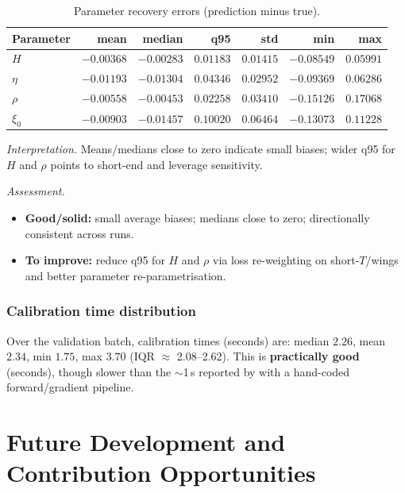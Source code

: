 	\begin{table}[t]
		\centering
		\caption{Parameter recovery errors (prediction minus true).}
		\label{tab:param_recovery}
		\begin{tabular}{lrrrrrr}
			\toprule
			Parameter & mean & median & q95 & std & min & max \\
			\midrule
			$H$   & $-0.00368$ & $-0.00283$ & $0.01183$ & $0.01415$ & $-0.08549$ & $0.05991$ \\
			$\eta$& $-0.01193$ & $-0.01304$ & $0.04346$ & $0.02952$ & $-0.09369$ & $0.06286$ \\
			$\rho$& $-0.00558$ & $-0.00453$ & $0.02258$ & $0.03410$ & $-0.15126$ & $0.17068$ \\
			$\xi_0$& $-0.00903$ & $-0.01457$ & $0.10020$ & $0.06464$ & $-0.13073$ & $0.11228$ \\
			\bottomrule
		\end{tabular}
		
		\smallskip
		\footnotesize
		\textit{Interpretation.} Means/medians close to zero indicate small biases; wider q95 for $H$ and $\rho$ points to short-end and leverage sensitivity.
	\end{table}
	
	\noindent\textit{Assessment.}
	\begin{itemize}
		\item \textbf{Good/solid:} small average biases; medians close to zero; directionally consistent across runs.
		\item \textbf{To improve:} reduce q95 for $H$ and $\rho$ via loss re-weighting on short-$T$/wings and better parameter re-parametrisation.
	\end{itemize}
	
	\subsection*{Calibration time distribution}
	
	Over the validation batch, calibration times (seconds) are: median $2.26$, mean $2.34$, min $1.75$, max $3.70$ (IQR $\approx$ 2.08–2.62). This is \textbf{practically good} (seconds), though slower than the $\sim$1\,s reported by \citet{Baschetti2024DeepCalibrationRandomGrids} with a hand-coded forward/gradient pipeline.
	
	
	\chapter{Future Development and Contribution Opportunities}
	\label{ch:future-development}
	
